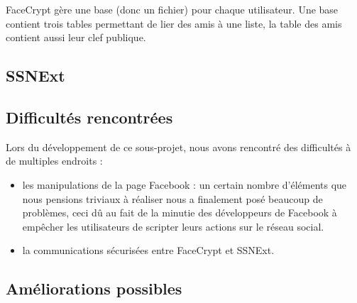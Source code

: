\documentclass[a4paper,11pt,french]{article}
\begin{document}
FaceCrypt gère une base (donc un fichier) pour chaque utilisateur. Une base 
contient trois tables permettant de lier des amis à une liste, la table des 
amis contient aussi leur clef publique.

\subsection{SSNExt} %

\subsection{Difficultés rencontrées}
Lors du développement de ce sous-projet, nous avons rencontré des difficultés
à de multiples endroits :
\begin{itemize}
    \item les manipulations de la page Facebook : un certain nombre d'éléments 
    que nous pensions triviaux à réaliser nous a finalement posé beaucoup de 
    problèmes, ceci dû au fait de la minutie des développeurs de Facebook à
    empêcher les utilisateurs de \og{}scripter \fg{} leurs actions sur le réseau
    social.
    \item la communications sécurisées entre FaceCrypt et SSNExt. %
\end{itemize}

\subsection{Améliorations possibles}
\end{document}
